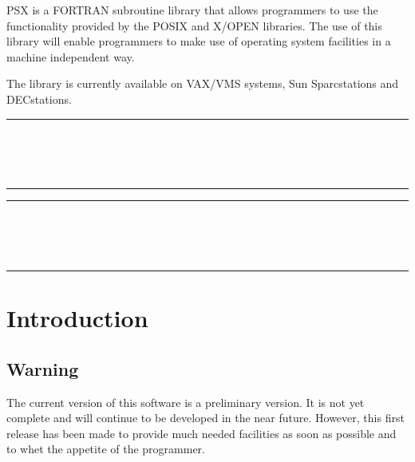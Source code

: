 PSX is a FORTRAN subroutine library that allows programmers to use the
functionality provided by the POSIX and X/OPEN libraries. The use of this
library will enable programmers to make use of operating system facilities in a
machine independent way.

The library is currently available on VAX/VMS systems, Sun Sparcstations and
DECstations. 

\markright{\stardocname}
\newpage
\markright{\stardocname}

\null\vspace {5mm}
\begin {center}
\rule{80mm}{0.5mm} \\ [1ex]
{\Large\bf \stardoctitle \\ [2.5ex]
           \stardocversion} \\ [2ex]
\rule{80mm}{0.5mm}
\end{center}
\vspace{30mm}

\setlength{\parskip}{0mm}
\tableofcontents
\setlength{\parskip}{\medskipamount}
\markright{\stardocname}
\newpage
\renewcommand{\thepage}{\arabic{page}}
\setcounter{page}{1}

\null\vspace {5mm}
\begin {center}
\rule{80mm}{0.5mm} \\ [1ex]
{\Large\bf \stardoctitle \\ [2.5ex]
           \stardocversion} \\ [2ex]
\rule{80mm}{0.5mm}
\end{center}
\vspace{30mm}


\section{Introduction}

\subsection{Warning}

The current version of this software is a preliminary version. It is not yet
complete and will continue to be developed in the near future. However, this
first release has been made to provide much needed facilities as soon as
possible and to whet the appetite of the programmer.

